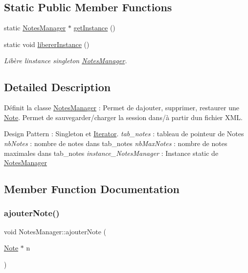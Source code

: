 \subsection*{Static Public Member Functions}
\begin{DoxyCompactItemize}
\item 
static \hyperlink{class_notes_manager}{Notes\+Manager} $\ast$ \hyperlink{class_notes_manager_a3d36759eb18d8947efe963926e157ee0}{get\+Instance} ()
\item 
\mbox{\label{class_notes_manager_a0bc9bbb0fc833106ea703b292c80307f}} 
static void \hyperlink{class_notes_manager_a0bc9bbb0fc833106ea703b292c80307f}{liberer\+Instance} ()
\begin{DoxyCompactList}\small\item\em Libère l\textquotesingle{}instance singleton \hyperlink{class_notes_manager}{Notes\+Manager}. \end{DoxyCompactList}\end{DoxyCompactItemize}


\subsection{Detailed Description}
Définit la classe \hyperlink{class_notes_manager}{Notes\+Manager} \+: Permet de d\textquotesingle{}ajouter, supprimer, restaurer une \hyperlink{class_note}{Note}. Permet de sauvegarder/charger la session dans/à partir d\textquotesingle{}un fichier X\+ML. 

Design Pattern \+: Singleton et \hyperlink{class_iterator}{Iterator}. {\itshape tab\+\_\+notes} \+: tableau de pointeur de Notes {\itshape nb\+Notes} \+: nombre de notes dans tab\+\_\+notes {\itshape nb\+Max\+Notes} \+: nombre de notes maximales dans tab\+\_\+notes {\itshape instance\+\_\+\+Notes\+Manager} \+: Instance static de \hyperlink{class_notes_manager}{Notes\+Manager} 

\subsection{Member Function Documentation}
\mbox{\label{class_notes_manager_af2d7d2d4d4bb575ce7962e5f011143cc}} 
\subsubsection{\texorpdfstring{ajouter\+Note()}{ajouterNote()}}
{\footnotesize\ttfamily void Notes\+Manager\+::ajouter\+Note (\begin{DoxyParamCaption}\item[{\hyperlink{class_note}{Note} $\ast$}]{n }\end{DoxyParamCaption})}



